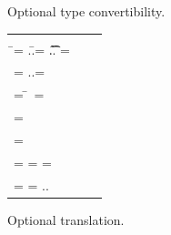 \documentclass[runnningheads]{tex/llncs}
\begin{document}
\begin{figure}[hb]
	\hrulefill  \small  \vspace{-3mm}
	
	\begin{mathpar}
		
		
	\end{mathpar}
	\vspace{-8mm}
	
	\hrulefill\caption{Optional type convertibility.}\label{tsts2}
\end{figure}


\begin{figure}[hb]	
	\hrulefill
	
	\smallskip
	
	\begin{tabular}{@{}l@{~ ~ ~ ~~~~~~~~~~~~~~~~~~~~~~~~~~~~~~~~~~~~}ll}
		\small
		\begin{minipage}{8cm}  
			\begin{tabbing}
				\TR{\Class \C{\fd[1]..}{\md[1] .. } } = \src{ \Class \C{ \fdp[1]..}{\mdp[1]..}}\\ \HS\HS\HS\HS\HS\HS\HS\HS\HS\HS\HS\HS\HS\HS\HS\HS \WHERE\HS
				\=\fdp[1] = \src{\Ftype\f\any}..\HS\HS\=\fd[1] = \Ftype\f\t .. \HS\HS\=\md[1] = \Mdef\m\x{\t[1]}{\t[2]}\e \\
				\>\mdp[1] = \src{\Mdef\m\x\any\any\ep}..\HS\HS \>\>\ep = \TR{\e}
			\end{tabbing}
			\begin{tabbing}
				\TR{\FRead\f}\HS\HS\HS\HS\= = \src{\FRead\f}
				\\
				\TR{\FWrite\f\e} \> = \src{\FWrite\f\ep} \HS\HS\HS\HS\HS\=\WHERE~\ep=\TR\e
				\\
				\TR\this           \>= \src{\SubCast\any\this}
				\\
				\TR\x \> = \src \x
				\\
				\TR{\Call{\e[1]}\m{\e[2]}} \> = \src{\DynCall{\ep[1]}{\m}{\ep[2]}} \HS\>\WHERE\HS\ep[1] = \TR{ \e[1]} \HS \ep[2] = \TR{\e[2]}
				\\
				\TR{\New\C{\e[1]..}} \> = \src{\SubCast\any{\New\C{\ep[1]..}}} \HS \>\WHERE \HS   \ep[1] = \TR{\e[1]} ..
			\end{tabbing}
		\end{minipage}
	\end{tabular}
	
	\smallskip
	\hrulefill
	\caption{Optional translation.}\label{tst2}
	
\end{figure}
\end{document}
